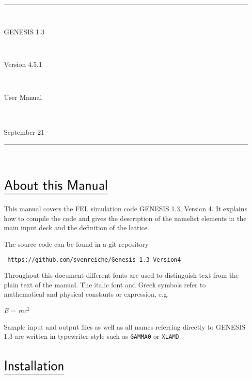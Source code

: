 \documentclass[12pt]{book}
\begin{document}
{
\setlength{\parskip}{0cm}
   
{~}\\
\thispagestyle{empty}
\rule{\textwidth}{0.2cm}\\
{\rule{0cm}{4cm}\Huge\sf\hspace{2cm}GENESIS 1.3}\\
\vspace{1cm}
{\rule{0cm}{2cm}\LARGE\sf\hspace{2cm}Version 4.5.1}\\
\vspace{1cm}
{\rule{0cm}{2cm}\LARGE\sf\hspace{2cm}User Manual}\\
\vspace{10cm}\\
{\sf September-21}\\
\rule{\textwidth}{0.2cm}\\
\vspace{5cm}
\pagebreak

\tableofcontents
 
}
   
\chapter*{\vspace{-3cm}$\underline{\mbox{\rule[-0.5em]{0cm}{1em}\huge\sf About this Manual}}$}
 
This manual covers the FEL simulation code GENESIS 1.3, Version 4. It explains how to compile the code and gives the description of the namelist elements in the main input deck and the definition of the lattice.

The source code can be found in a git repository

{\tt
https://github.com/svenreiche/Genesis-1.3-Version4
}


Throughout this document different fonts are used to distinguish text from the plain text 
of the manual. The italic font and Greek symbols refer to mathematical and physical 
constants or expression, e.g.

{\it E} = {\it mc}$^{2}$

Sample input and output files as well as all names referring directly to GENESIS 1.3 are 
written in typewriter-style such as {\tt GAMMA0} or {\tt XLAMD}.




\chapter*{\vspace{-3cm}$\underline{\mbox{\rule[-0.5em]{0cm}{1em}\huge\sf Installation}}$}
 
\end{document}

